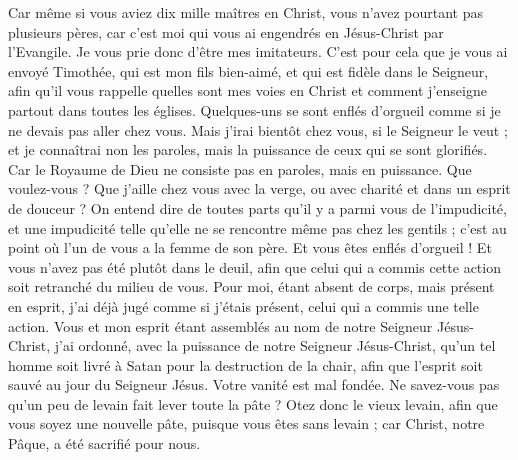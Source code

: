 \begin{multicols}{2}
Car même si vous aviez dix mille maîtres en Christ, vous n'avez pourtant pas plusieurs pères, car c'est moi qui vous ai engendrés en Jésus-Christ par l'Evangile.
Je vous prie donc d'être mes imitateurs.
C'est pour cela que je vous ai envoyé Timothée, qui est mon fils bien-aimé, et qui est fidèle dans le Seigneur, afin qu'il vous rappelle quelles sont mes voies en Christ et comment j'enseigne partout dans toutes les églises.
Quelques-uns se sont enflés d’orgueil comme si je ne devais pas aller chez vous.
Mais j'irai bientôt chez vous, si le Seigneur le veut ; et je connaîtrai non les paroles, mais la puissance de ceux qui se sont glorifiés.
Car le Royaume de Dieu ne consiste pas en paroles, mais en puissance.
Que voulez-vous ? Que j’aille chez vous avec la verge, ou avec charité et dans un esprit de douceur ?
\VerseOne{}On entend dire de toutes parts qu'il y a parmi vous de l’impudicité, et une impudicité telle qu’elle ne se rencontre même pas chez les gentils ; c'est au point où l’un de vous a la femme de son père.
Et vous êtes enflés d'orgueil ! Et vous n'avez pas été plutôt dans le deuil, afin que celui qui a commis cette action soit retranché du milieu de vous.
Pour moi, étant absent de corps, mais présent en esprit, j'ai déjà jugé comme si j'étais présent, celui qui a commis une telle action.
Vous et mon esprit étant assemblés au nom de notre Seigneur Jésus-Christ, j'ai ordonné, avec la puissance de notre Seigneur Jésus-Christ,
qu'un tel homme soit livré à Satan  pour la destruction de la chair, afin que l'esprit soit sauvé au jour du Seigneur Jésus.
Votre vanité est mal fondée. Ne savez-vous pas qu'un peu de levain fait lever toute la pâte ?
Otez donc le vieux levain, afin que vous soyez une nouvelle pâte, puisque vous êtes sans levain ; car Christ, notre Pâque, a été sacrifié pour nous.

\end{multicols}

